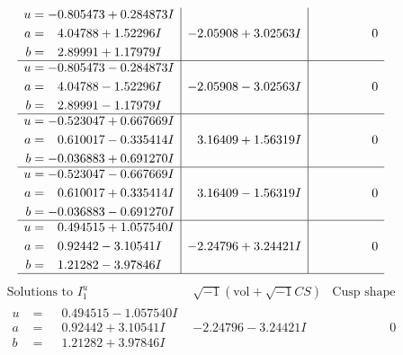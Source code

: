 \documentclass[1p]{elsarticle_modified}
\theoremstyle{definition}
\newcommand{\I}{\sqrt{-1}}
\begin{document}
$$\begin{array}{c|c|c}
\begin{aligned}
u &= -0.805473 + 0.284873 I \\
a &= \phantom{-}4.04788 + 1.52296 I \\
b &= \phantom{-}2.89991 + 1.17979 I\end{aligned}
 & -2.05908 + 3.02563 I & \phantom{-0.000000 } 0 \\ \hline\begin{aligned}
u &= -0.805473 - 0.284873 I \\
a &= \phantom{-}4.04788 - 1.52296 I \\
b &= \phantom{-}2.89991 - 1.17979 I\end{aligned}
 & -2.05908 - 3.02563 I & \phantom{-0.000000 } 0 \\ \hline\begin{aligned}
u &= -0.523047 + 0.667669 I \\
a &= \phantom{-}0.610017 - 0.335414 I \\
b &= -0.036883 + 0.691270 I\end{aligned}
 & \phantom{-}3.16409 + 1.56319 I & \phantom{-0.000000 } 0 \\ \hline\begin{aligned}
u &= -0.523047 - 0.667669 I \\
a &= \phantom{-}0.610017 + 0.335414 I \\
b &= -0.036883 - 0.691270 I\end{aligned}
 & \phantom{-}3.16409 - 1.56319 I & \phantom{-0.000000 } 0 \\ \hline\begin{aligned}
u &= \phantom{-}0.494515 + 1.057540 I \\
a &= \phantom{-}0.92442 - 3.10541 I \\
b &= \phantom{-}1.21282 - 3.97846 I\end{aligned}
 & -2.24796 + 3.24421 I & \phantom{-0.000000 } 0\\
 \hline 
 \end{array}$$\newpage$$\begin{array}{c|c|c}  
\text{Solutions to }I^u_{1}& \I (\text{vol} + \sqrt{-1}CS) & \text{Cusp shape}\\
 \hline 
\begin{aligned}
u &= \phantom{-}0.494515 - 1.057540 I \\
a &= \phantom{-}0.92442 + 3.10541 I \\
b &= \phantom{-}1.21282 + 3.97846 I\end{aligned}
 & -2.24796 - 3.24421 I & \phantom{-0.000000 } 0 \\ \hline\begin{aligned}

\end{aligned}
\end{array}$$
\end{document}
